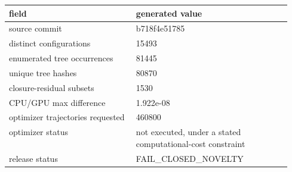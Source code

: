 \begin{tabular}{@{}lp{0.55\linewidth}@{}}
\toprule
field & generated value \\
\midrule
source commit & b718f4e51785 \\
distinct configurations & 15493 \\
enumerated tree occurrences & 81445 \\
unique tree hashes & 80870 \\
closure-residual subsets & 1530 \\
CPU/GPU max difference & 1.922e-08 \\
optimizer trajectories requested & 460800 \\
optimizer status & not executed, under a stated computational-cost constraint \\
release status & FAIL\allowbreak\_CLOSED\allowbreak\_NOVELTY \\
\bottomrule
\end{tabular}
